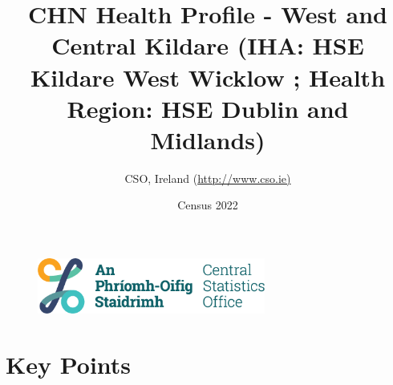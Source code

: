 \documentclass{article}
\title{CHN Health Profile - West and Central Kildare (IHA: HSE Kildare West Wicklow ;  Health Region: HSE Dublin and Midlands) }
\date{Census 2022}
\author{CSO, Ireland  (\url{http://www.cso.ie)}}
\begin{document}


\begin{figure}
	\centering
\includegraphics[width =75mm]{../figures/CSO_Logo.png}
\end{figure}

				 
		   
						  
														  
																																													
												 
			 
\maketitle
					
													   
				 
						 
																																																																											   
				 
				  
  \pagebreak
    	    \tableofcontents

\pagebreak


\section{Key Points}
\end{document}
